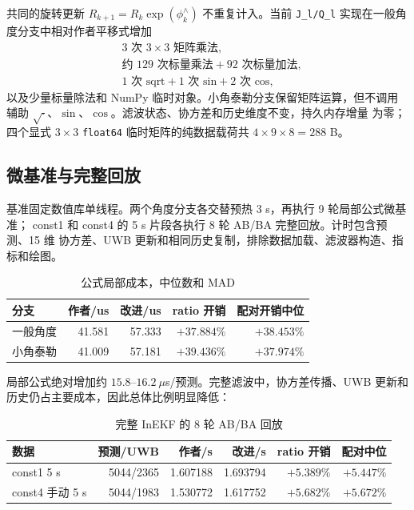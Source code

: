 \documentclass[11pt,a4paper]{ctexart}
\begin{document}
共同的旋转更新 $R_{k+1}=R_k\exp(\phi_k^\wedge)$ 不重复计入。当前
\texttt{J\_l/Q\_l} 实现在一般角度分支中相对作者平移式增加
\begin{equation}
\boxed{
\begin{aligned}
 &3\text{ 次 }3\times3\text{ 矩阵乘法},\\
 &\text{约 }129\text{ 次标量乘法}+92\text{ 次标量加法},\\
 &1\text{ 次 sqrt}+1\text{ 次 sin}+2\text{ 次 cos},
\end{aligned}}
\end{equation}
以及少量标量除法和 NumPy 临时对象。小角泰勒分支保留矩阵运算，但不调用辅助
$\sqrt{\cdot}$、$\sin$、$\cos$。滤波状态、协方差和历史维度不变，持久内存增量
为零；四个显式 $3\times3$ \texttt{float64} 临时矩阵的纯数据载荷共
$4\times9\times8=288$ B。

\subsection{微基准与完整回放}

基准固定数值库单线程。两个角度分支各交替预热 3 s，再执行 9 轮局部公式微基准；
const1 和 const4 的 5 s 片段各执行 8 轮 AB/BA 完整回放。计时包含预测、15 维
协方差、UWB 更新和相同历史复制，排除数据加载、滤波器构造、指标和绘图。

\begin{table}[H]
\centering
\small
\caption{公式局部成本，中位数和 MAD}
\begin{tabular}{lrrrr}
\toprule
分支 & 作者/us & 改进/us & ratio 开销 & 配对开销中位\\
\midrule
一般角度 & 41.581 & 57.333 & $+37.884\%$ & $+38.453\%$\\
小角泰勒 & 41.009 & 57.181 & $+39.436\%$ & $+37.974\%$\\
\bottomrule
\end{tabular}
\end{table}

局部公式绝对增加约 $15.8$--$16.2~\mu$s/预测。完整滤波中，协方差传播、UWB
更新和历史仍占主要成本，因此总体比例明显降低：

\begin{table}[H]
\centering
\small
\caption{完整 InEKF 的 8 轮 AB/BA 回放}
\begin{tabular}{lrrrrr}
\toprule
数据 & 预测/UWB & 作者/s & 改进/s & ratio 开销 & 配对中位\\
\midrule
const1 5 s & 5044/2365 & 1.607188 & 1.693794 & $+5.389\%$ & $+5.447\%$\\
const4 手动 5 s & 5044/1983 & 1.530772 & 1.617752 & $+5.682\%$ & $+5.672\%$\\
\bottomrule
\end{tabular}
\end{table}
\end{document}
